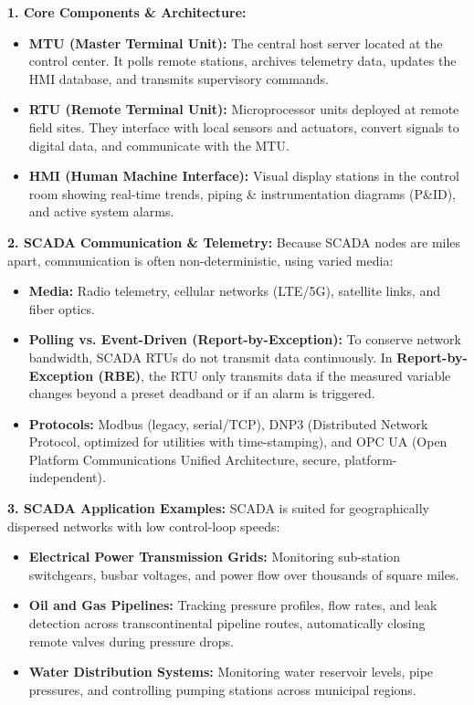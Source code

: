 \documentclass[12pt,a4paper]{article}
\begin{document}
\textbf{1. Core Components \& Architecture:}
\begin{itemize}[leftmargin=*, itemsep=2.5pt]
  \item \textbf{MTU (Master Terminal Unit):} The central host server located at the control center. It polls remote stations, archives telemetry data, updates the HMI database, and transmits supervisory commands.
  \item \textbf{RTU (Remote Terminal Unit):} Microprocessor units deployed at remote field sites. They interface with local sensors and actuators, convert signals to digital data, and communicate with the MTU.
  \item \textbf{HMI (Human Machine Interface):} Visual display stations in the control room showing real-time trends, piping \& instrumentation diagrams (P\&ID), and active system alarms.
\end{itemize}

\textbf{2. SCADA Communication \& Telemetry:}
Because SCADA nodes are miles apart, communication is often non-deterministic, using varied media:
\begin{itemize}[leftmargin=*, itemsep=2.5pt]
  \item \textbf{Media:} Radio telemetry, cellular networks (LTE/5G), satellite links, and fiber optics.
  \item \textbf{Polling vs. Event-Driven (Report-by-Exception):} To conserve network bandwidth, SCADA RTUs do not transmit data continuously. In \textbf{Report-by-Exception (RBE)}, the RTU only transmits data if the measured variable changes beyond a preset deadband or if an alarm is triggered.
  \item \textbf{Protocols:} Modbus (legacy, serial/TCP), DNP3 (Distributed Network Protocol, optimized for utilities with time-stamping), and OPC UA (Open Platform Communications Unified Architecture, secure, platform-independent).
\end{itemize}

\textbf{3. SCADA Application Examples:}
SCADA is suited for geographically dispersed networks with low control-loop speeds:
\begin{itemize}[leftmargin=*, itemsep=2pt]
  \item \textbf{Electrical Power Transmission Grids:} Monitoring sub-station switchgears, busbar voltages, and power flow over thousands of square miles.
  \item \textbf{Oil and Gas Pipelines:} Tracking pressure profiles, flow rates, and leak detection across transcontinental pipeline routes, automatically closing remote valves during pressure drops.
  \item \textbf{Water Distribution Systems:} Monitoring water reservoir levels, pipe pressures, and controlling pumping stations across municipal regions.
\end{itemize}
\end{document}
